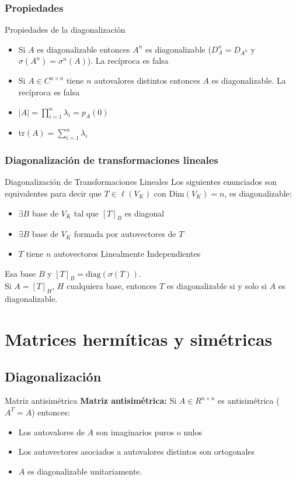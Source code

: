 \documentclass[a4paper, twoside]{article}
\numberwithin{equation}{section}
\numberwithin{figure}{section}
\numberwithin{table}{section}
\newcommand{\dime}[1]{\text{Dim}(#1)}
\newcommand{\dete}[1]{\left\vert #1 \right\vert}
\newcommand{\tr}[1]{\text{tr}(#1)}
\begin{document}
\subsubsection{Propiedades}
\begin{definicion*}{Propiedades de la diagonalización}
	\begin{itemize}
		\item Si $A$ es diagonalizable entonces $A^n$ es diagonalizable ($D_A^n=D_{A^n}$ y $\sigma(A^n) = \sigma^n(A)$). La recíproca es falsa
		\item Si $A \in C^{n \times n}$ tiene $n$ autovalores distintos entonces $A$ es diagonalizable. La recíproca es falsa
		\item $\dete{A}=\prod_{i=1}^n \lambda_i=p_A(0)$
		\item $\tr{A}=\sum_{i=1}^n \lambda_i$
	\end{itemize}
\end{definicion*}

\subsubsection{Diagonalización de transformaciones lineales}
\begin{definicion*}{Diagonalización de Transformaciones Lineales}
	Los siguientes enunciados son equivalentes para decir que $T \in \ell (V_K)$ con $\dime{V_K}=n$, es diagonalizable:
	\begin{itemize}
		\item $\exists B$ base de $V_K$ tal que $[T]_B$ es diagonal
		\item $\exists B$ base de $V_K$ formada por autovectores de $T$
		\item $T$ tiene $n$ autovectores Linealmente Independientes 
	\end{itemize}
	Esa base $B$ y $[T]_B=\text{diag}(\sigma(T))$.\\
	
	Si $A=[T]_H$, $H$ cualquiera base, entonces $T$ es diagonalizable si y solo si $A$ es diagonalizable.
\end{definicion*}

\newpage
\section{Matrices hermíticas y simétricas}
\subsection{Diagonalización}
\begin{definicion*}{Matriz antisimétrica}
	\textbf{Matriz antisimétrica:} Si $A \in R^{n \times n}$ es antisimétrica ($A^T=A$) entonces:
	\begin{itemize}
		\item Los autovalores de $A$ son imaginarios puros o nulos
		\item Los autovectores asociados a autovalores distintos son ortogonales
		\item $A$ es diagonalizable unitariamente.
	\end{itemize}
\end{definicion*}
\end{document}
